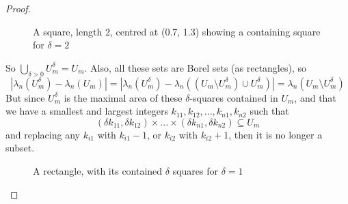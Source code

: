 \documentclass{article}
\theoremstyle{plain}
\theoremstyle{definition}
\theoremstyle{remark}
\begin{document}
\begin{proof}
        \begin{figure}[h]
        \begin{center}
        \end{center}
        \caption{A square, length 2, centred at (0.7, 1.3) showing a containing square for $\delta =2$}
        \end{figure}
    
        
        So $\bigcup \limits _{\delta >0} U_m^\delta = U_m$. Also, all these sets are Borel sets (as rectangles), so \[
        |\lambda _n(U_m^\delta) - \lambda _n(U_m)|= |\lambda_n(U_m^\delta) - \lambda _n((U_m\setminus U_m ^\delta ) \cup U_m^\delta )| = \lambda_n(U_m \setminus U_m^\delta )
        \]
        But since $U_m^\delta$ is the maximal area of these $\delta$-squares contained in $U_m$, and that we have a smallest and largest integers $k_{11}, k_{12}, ..., k_{n1}, k_{n2}$ such that 
        \[(\delta k_{11}, \delta k_{12}) \times ...\times (\delta k_{n1}, \delta k_{n2}) \subseteq U_m \]  and replacing any $k_{i1}$ with $k_{i1}-1$, or $k_{i2}$ with $k_{i2}+1$, then it is no longer a subset. 
        
        \begin{figure}[h]
        \begin{center}
        \end{center}
        \caption{A rectangle, with its contained $\delta$ squares for $\delta  = 1$}
        \end{figure}
        

\end{proof}
\end{document}
